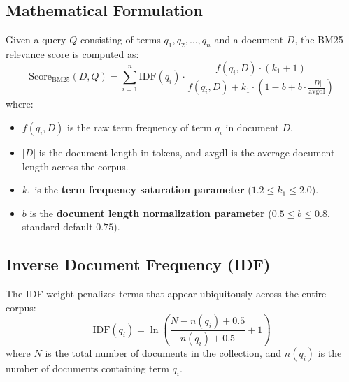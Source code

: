 \subsection{Mathematical Formulation}
Given a query $Q$ consisting of terms $q_1, q_2, \dots, q_n$ and a document $D$, the BM25 relevance score is computed as:
\begin{equation}
\text{Score}_{\text{BM25}}(D, Q) = \sum_{i=1}^n \text{IDF}(q_i) \cdot \frac{f(q_i, D) \cdot (k_1 + 1)}{f(q_i, D) + k_1 \cdot \left(1 - b + b \cdot \frac{|D|}{\text{avgdl}}\right)}
\end{equation}
where:
\begin{itemize}[leftmargin=18pt]
  \item $f(q_i, D)$ is the raw term frequency of term $q_i$ in document $D$.
  \item $|D|$ is the document length in tokens, and $\text{avgdl}$ is the average document length across the corpus.
  \item $k_1$ is the \textbf{term frequency saturation parameter} ($1.2 \le k_1 \le 2.0$).
  \item $b$ is the \textbf{document length normalization parameter} ($0.5 \le b \le 0.8$, standard default $0.75$).
\end{itemize}

\subsection{Inverse Document Frequency (IDF)}
The IDF weight penalizes terms that appear ubiquitously across the entire corpus:
\begin{equation}
\text{IDF}(q_i) = \ln \left( \frac{N - n(q_i) + 0.5}{n(q_i) + 0.5} + 1 \right)
\end{equation}
where $N$ is the total number of documents in the collection, and $n(q_i)$ is the number of documents containing term $q_i$.

